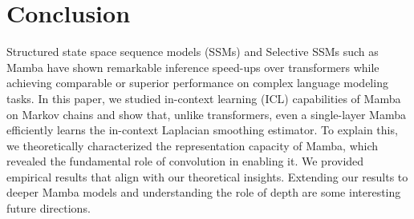 
\section{Conclusion}
Structured state space sequence models (SSMs) and Selective SSMs such as Mamba have shown remarkable inference speed-ups over transformers while achieving comparable or superior performance on complex language modeling tasks. In this paper, we studied in-context learning (ICL) capabilities of Mamba on Markov chains and show that, unlike transformers, even a single-layer Mamba efficiently learns the in-context Laplacian smoothing estimator. To explain this, we theoretically characterized the representation capacity of Mamba, which revealed the fundamental role of convolution in enabling it. We provided empirical results that align with our theoretical insights. Extending our results to deeper Mamba models and understanding the role of depth are some interesting future directions.